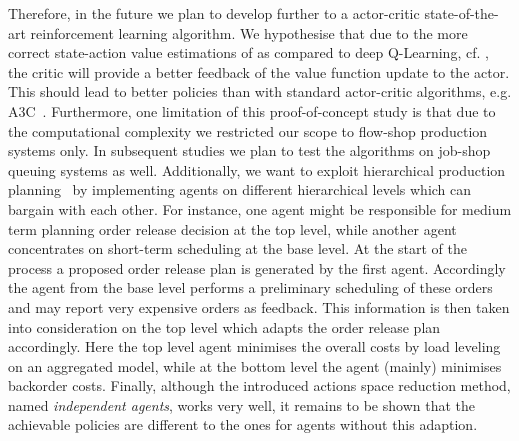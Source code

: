 \documentclass[envcountsame]{llncs}
\newcommand\MS[2][r]{\ifx t#1 \textcolor{blue}{[\textbf{MS:} #2]}
  \else \begin{center}\textcolor{blue}{\textbf{MS:} #2} \end{center} \fi}
\begin{document}
Therefore, in the future we plan to develop \ARA{} further to a actor-critic state-of-the-art
reinforcement learning algorithm. We hypothesise that due to the more correct state-action value
estimations of \ARA{} as compared to deep Q-Learning, cf. \citet{schneckenreither2020average}, the
critic will provide a better feedback of the value function update to the actor. This should lead to
better policies than with standard actor-critic algorithms, e.g. A3C~\citep{mnih2016asynchronous}.
%
Furthermore, one limitation of this proof-of-concept study is that due to the computational
complexity we restricted our scope to flow-shop production systems only. In subsequent studies we
plan to test the algorithms on job-shop queuing systems as well.
%
Additionally, we want to exploit hierarchical production
planning~\citep{schneeweibeta1995hierarchical} by implementing agents on different hierarchical
levels which can bargain with each other. For instance, one agent might be responsible for medium
term planning order release decision at the top level, while another agent concentrates on
short-term scheduling at the base level. At the start of the process a proposed order release plan
is generated by the first agent. Accordingly the agent from the base level performs a preliminary
scheduling of these orders and may report very expensive orders as feedback. This information is
then taken into consideration on the top level which adapts the order release plan accordingly. Here
the top level agent minimises the overall costs by load leveling on an aggregated model, while at
the bottom level the agent (mainly) minimises backorder costs.
%
Finally, although the introduced actions space reduction method, named \textit{independent agents},
works very well, it remains to be shown that the achievable policies are different to the ones for
agents without this adaption.





\end{document}
